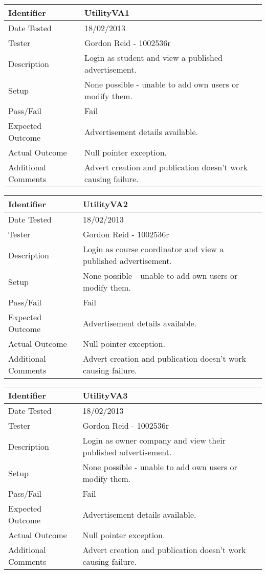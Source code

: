 \begin{tabularx}{\textwidth}{|T|L|}
\hline
Identifier & UtilityVA1\\
\hline
Date Tested & 18/02/2013\\
\hline
Tester & Gordon Reid - 1002536r\\
\hline
Description & Login as student and view a published advertisement.\\
\hline
Setup & None possible - unable to add own users or modify them.\\
\hline
Pass/Fail & Fail\\
\hline
Expected Outcome & Advertisement details available.\\
\hline
Actual Outcome & Null pointer exception.\\
\hline
Additional Comments & Advert creation and publication doesn't work causing
failure.\\
\hline
\end{tabularx}

\vspace{2em}

\begin{tabularx}{\textwidth}{|T|L|}
\hline
Identifier & UtilityVA2\\
\hline
Date Tested & 18/02/2013\\
\hline
Tester & Gordon Reid - 1002536r\\
\hline
Description & Login as course coordinator and view a published advertisement.\\
\hline
Setup & None possible - unable to add own users or modify them.\\
\hline
Pass/Fail & Fail\\
\hline
Expected Outcome & Advertisement details available.\\
\hline
Actual Outcome & Null pointer exception.\\
\hline
Additional Comments & Advert creation and publication doesn't work causing
failure.\\
\hline
\end{tabularx}

\vspace{2em}

\begin{tabularx}{\textwidth}{|T|L|}
\hline
Identifier & UtilityVA3\\
\hline
Date Tested & 18/02/2013\\
\hline
Tester & Gordon Reid - 1002536r\\
\hline
Description & Login as owner company and view their published advertisement.\\
\hline
Setup & None possible - unable to add own users or modify them.\\
\hline
Pass/Fail & Fail\\
\hline
Expected Outcome & Advertisement details available.\\
\hline
Actual Outcome & Null pointer exception.\\
\hline
Additional Comments & Advert creation and publication doesn't work causing
failure.\\
\hline
\end{tabularx}

